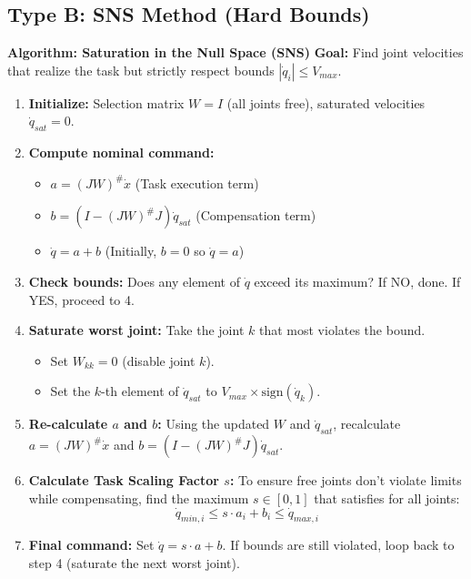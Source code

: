 \documentclass[11pt,a4paper]{article}
\begin{document}
\subsection{Type B: SNS Method (Hard Bounds)}

 \textbf{Algorithm: Saturation in the Null Space (SNS)}
\textbf{Goal:} Find joint velocities that realize the task but strictly respect bounds $|\dot{q}_i| \leq V_{max}$.
\begin{enumerate}
    \item \textbf{Initialize:} Selection matrix $W = I$ (all joints free), saturated velocities $\dot{q}_{sat} = 0$.
    \item \textbf{Compute nominal command:} 
        \begin{itemize}
            \item $a = (JW)^\# \dot{x}$  (Task execution term)
            \item $b = (I - (JW)^\# J)\dot{q}_{sat}$ (Compensation term)
            \item $\dot{q} = a + b$ (Initially, $b=0$ so $\dot{q}=a$)
        \end{itemize}
    \item \textbf{Check bounds:} Does any element of $\dot{q}$ exceed its maximum? If NO, done. If YES, proceed to 4.
    \item \textbf{Saturate worst joint:} Take the joint $k$ that most violates the bound. 
        \begin{itemize}
            \item Set $W_{kk} = 0$ (disable joint $k$).
            \item Set the $k$-th element of $\dot{q}_{sat}$ to $V_{max} \times \text{sign}(\dot{q}_k)$.
        \end{itemize}
    \item \textbf{Re-calculate $a$ and $b$:} Using the updated $W$ and $\dot{q}_{sat}$, recalculate $a = (JW)^\# \dot{x}$ and $b = (I - (JW)^\# J)\dot{q}_{sat}$.
    \item \textbf{Calculate Task Scaling Factor $s$:} To ensure free joints don't violate limits while compensating, find the maximum $s \in [0,1]$ that satisfies for all joints:
    $$ \dot{q}_{min, i} \le s \cdot a_i + b_i \le \dot{q}_{max, i} $$
    \item \textbf{Final command:} Set $\dot{q} = s \cdot a + b$. If bounds are still violated, loop back to step 4 (saturate the next worst joint).
\end{enumerate}
\end{document}
